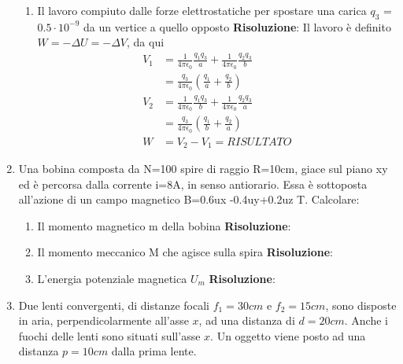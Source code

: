 \documentclass{article}
\begin{document}
\begin{enumerate}
\begin{enumerate}
        \item Il lavoro compiuto dalle forze elettrostatiche per spostare una carica $q_3$
        = $0.5 \cdot 10^{-9}$ da un vertice a quello opposto
        \newline 
        \textbf{Risoluzione}: Il lavoro è definito $W = -\Delta U = -\Delta V$, da qui
        \begin{align*}
            V_1 & = \frac{1}{4 \pi \epsilon_0}\frac{q_1q_3}{a} + \frac{1}{4 \pi \epsilon_0}\frac{q_2q_3}{b} \\ 
                & = \frac{q_3}{4 \pi \epsilon_0} \left( \frac{q_1}{a} + \frac{q_2}{b} \right) \\ 
            V_2 & = \frac{1}{4 \pi \epsilon_0}\frac{q_1q_3}{b} + \frac{1}{4 \pi \epsilon_0}\frac{q_2q_3}{a} \\ 
                & = \frac{q_3}{4 \pi \epsilon_0} \left( \frac{q_1}{b} + \frac{q_2}{a} \right) \\
            W   & = V_2 - V_1 = RISULTATO
        \end{align*} 


    \end{enumerate}

    \item Una bobina composta da N=100 spire di raggio R=10cm, giace sul piano xy ed è percorsa dalla corrente
    i=8A, in senso antiorario. Essa è sottoposta all’azione di un campo magnetico B=0.6ux -0.4uy+0.2uz T.
    Calcolare:

    \begin{enumerate}
        
        \item Il momento magnetico m della bobina
        \newline 
        \textbf{Risoluzione}:

        \item Il momento meccanico M che agisce sulla spira
        \newline 
        \textbf{Risoluzione}:
        
        \item L’energia potenziale magnetica $U_m$
        \newline 
        \textbf{Risoluzione}:

    \end{enumerate}

    \item Due lenti convergenti, di distanze focali $f_1 = 30 cm$ e $f_2 = 15 cm$, sono
    disposte in aria, perpendicolarmente all’asse $x$, ad una distanza di $d =
    20 cm$. Anche i fuochi delle lenti sono situati sull’asse $x$. Un oggetto
    viene posto ad una distanza $p = 10 cm$ dalla prima lente.


\end{enumerate}
\end{document}
